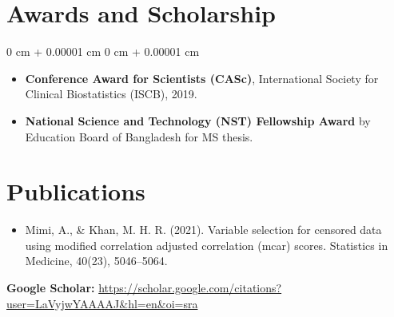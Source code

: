 \documentclass[10pt, letterpaper]{article}
\newenvironment{highlights}{
    \begin{itemize}[
        topsep=0.10 cm,
        parsep=0.10 cm,
        partopsep=0pt,
        itemsep=0pt,
        leftmargin=0 cm + 10pt
    ]
}{
    \end{itemize}
} %
\newenvironment{onecolentry}{
    \begin{adjustwidth}{
        0 cm + 0.00001 cm
    }{
        0 cm + 0.00001 cm
    }
}{
    \end{adjustwidth}
} %
\begin{document}
    \newpage
    \section{Awards and Scholarship}
        \begin{onecolentry}
            \begin{highlights}
                \item \textbf{Conference Award for Scientists (CASc)}, International Society for Clinical Biostatistics (ISCB), 2019.
                \item \textbf{National Science and Technology (NST) Fellowship Award} by Education Board of Bangladesh for MS thesis.
            \end{highlights}
        \end{onecolentry}


    \section{Publications}
        
        \begin{itemize}
            \item Mimi, A., \& Khan, M. H. R. (2021). Variable selection for censored data using modified correlation adjusted correlation (mcar) scores. Statistics in Medicine, 40(23), 5046–5064.     
           

        \end{itemize}
        \textbf{Google Scholar:} \href{https://scholar.google.com/citations?user=LaVyjwYAAAAJ&hl=en&oi=sra}{https://scholar.google.com/citations?user=LaVyjwYAAAAJ\&hl=en\&oi=sra}
\end{document}
